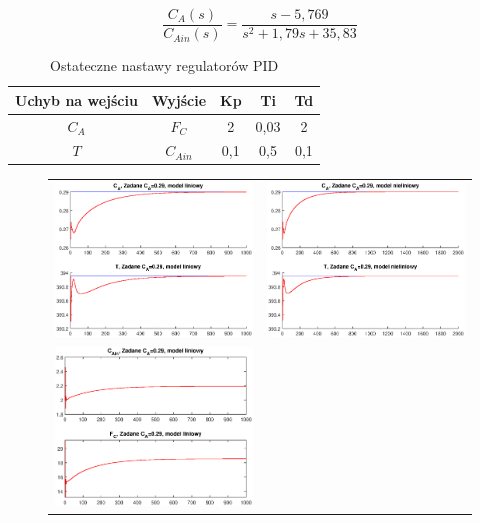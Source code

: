\begin{equation}
\frac{C_A(s)}{C_{Ain}(s)} = \frac{s-5,769}{s^2+1,79s+35,83}
\end{equation}

\begin{table}[h!]
	\centering
	\begin{tabular}{|c|c|c|c|c|}
		\hline
		Uchyb na wejściu&Wyjście&Kp&Ti&Td\\\hline
		$C_A$&$F_C$&2&0,03&2\\\hline
		$T$&$C_{Ain}$&0,1&0,5&0,1\\\hline
	\end{tabular}
\label{ch2:pidnastawy}
\caption{Ostateczne nastawy regulatorów PID}
\end{table}

\newpage
\begin{figure}
	\begin{tabular}{cc}
		\includegraphics[width=.5\linewidth]{img/pidlin/pidlin2.eps}
		&
		\includegraphics[width=.5\linewidth]{img/pidnlin/pidnlin2.eps}
		\\
		\includegraphics[width=.5\linewidth]{img/pidlin/pidlin1.eps}

\end{tabular}
\end{figure}
